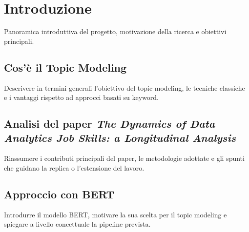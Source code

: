 \chapter{Introduzione}
Panoramica introduttiva del progetto, motivazione della ricerca e obiettivi principali.

\section{Cos'è il Topic Modeling}
Descrivere in termini generali l'obiettivo del topic modeling, le tecniche classiche e i vantaggi rispetto ad approcci basati su keyword.

\section{Analisi del paper \emph{The Dynamics of Data Analytics Job Skills: a Longitudinal Analysis}}
Riassumere i contributi principali del paper, le metodologie adottate e gli spunti che guidano la replica o l'estensione del lavoro.

\section{Approccio con BERT}
Introdurre il modello BERT, motivare la sua scelta per il topic modeling e spiegare a livello concettuale la pipeline prevista.
